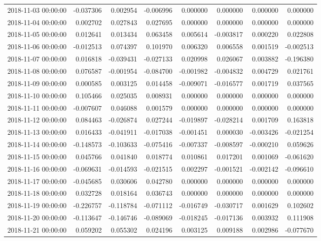 \begin{tabular}{lrrrrrrr}
2018-11-03 00:00:00 & -0.037306 & 0.002954 & -0.006996 & 0.000000 & 0.000000 & 0.000000 & 0.000000 \\
2018-11-04 00:00:00 & 0.002702 & 0.027843 & 0.027695 & 0.000000 & 0.000000 & 0.000000 & 0.000000 \\
2018-11-05 00:00:00 & 0.012641 & 0.013434 & 0.063458 & 0.005614 & -0.003817 & 0.000220 & 0.022808 \\
2018-11-06 00:00:00 & -0.012513 & 0.074397 & 0.101970 & 0.006320 & 0.006558 & 0.001519 & -0.002513 \\
2018-11-07 00:00:00 & 0.016818 & -0.039431 & -0.027133 & 0.020998 & 0.026067 & 0.003882 & -0.196380 \\
2018-11-08 00:00:00 & 0.076587 & -0.001954 & -0.084700 & -0.001982 & -0.004832 & 0.004729 & 0.021761 \\
2018-11-09 00:00:00 & 0.000585 & 0.003125 & 0.014458 & -0.009071 & -0.016577 & 0.001719 & 0.037565 \\
2018-11-10 00:00:00 & 0.105466 & 0.025035 & 0.008931 & 0.000000 & 0.000000 & 0.000000 & 0.000000 \\
2018-11-11 00:00:00 & -0.007607 & 0.046088 & 0.001579 & 0.000000 & 0.000000 & 0.000000 & 0.000000 \\
2018-11-12 00:00:00 & 0.084463 & -0.026874 & 0.027244 & -0.019897 & -0.028214 & 0.001709 & 0.163818 \\
2018-11-13 00:00:00 & 0.016433 & -0.041911 & -0.017038 & -0.001451 & 0.000030 & -0.003426 & -0.021254 \\
2018-11-14 00:00:00 & -0.148573 & -0.103633 & -0.075416 & -0.007337 & -0.008597 & -0.000210 & 0.059626 \\
2018-11-15 00:00:00 & 0.045766 & 0.041840 & 0.018774 & 0.010861 & 0.017201 & 0.001069 & -0.061620 \\
2018-11-16 00:00:00 & -0.069631 & -0.014593 & -0.021515 & 0.002297 & -0.001521 & -0.002142 & -0.096610 \\
2018-11-17 00:00:00 & -0.045685 & 0.030606 & 0.042780 & 0.000000 & 0.000000 & 0.000000 & 0.000000 \\
2018-11-18 00:00:00 & 0.032728 & 0.018164 & 0.036743 & 0.000000 & 0.000000 & 0.000000 & 0.000000 \\
2018-11-19 00:00:00 & -0.226757 & -0.118784 & -0.071112 & -0.016749 & -0.030717 & 0.001629 & 0.102602 \\
2018-11-20 00:00:00 & -0.113647 & -0.146746 & -0.089069 & -0.018245 & -0.017136 & 0.003932 & 0.111908 \\
2018-11-21 00:00:00 & 0.059202 & 0.055302 & 0.024196 & 0.003125 & 0.009188 & 0.002986 & -0.077670 \\

\end{tabular}
